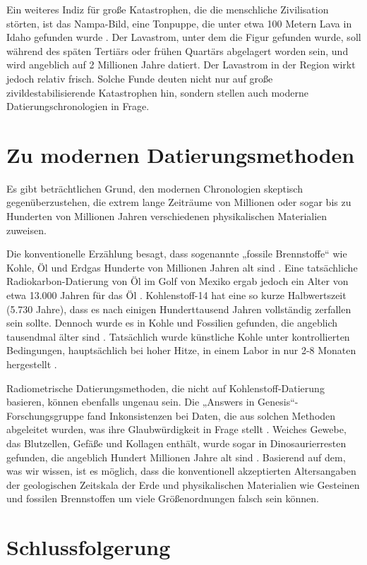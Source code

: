 \documentclass[10pt,twocolumn,letterpaper]{article}
\begin{document}
Ein weiteres Indiz für große Katastrophen, die die menschliche Zivilisation störten, ist das Nampa-Bild, eine Tonpuppe, die unter etwa 100 Metern Lava in Idaho gefunden wurde \cite{102,103}. Der Lavastrom, unter dem die Figur gefunden wurde, soll während des späten Tertiärs oder frühen Quartärs abgelagert worden sein, und wird angeblich auf 2 Millionen Jahre datiert. Der Lavastrom in der Region wirkt jedoch relativ frisch. Solche Funde deuten nicht nur auf große zivildestabilisierende Katastrophen hin, sondern stellen auch moderne Datierungschronologien in Frage.

\section{Zu modernen Datierungsmethoden}
Es gibt beträchtlichen Grund, den modernen Chronologien skeptisch gegenüberzustehen, die extrem lange Zeiträume von Millionen oder sogar bis zu Hunderten von Millionen Jahren verschiedenen physikalischen Materialien zuweisen.

Die konventionelle Erzählung besagt, dass sogenannte „fossile Brennstoffe“ wie Kohle, Öl und Erdgas Hunderte von Millionen Jahren alt sind \cite{104}. Eine tatsächliche Radiokarbon-Datierung von Öl im Golf von Mexiko ergab jedoch ein Alter von etwa 13.000 Jahren für das Öl \cite{105}. Kohlenstoff-14 hat eine so kurze Halbwertszeit (5.730 Jahre), dass es nach einigen Hunderttausend Jahren vollständig zerfallen sein sollte. Dennoch wurde es in Kohle und Fossilien gefunden, die angeblich tausendmal älter sind \cite{106}. Tatsächlich wurde künstliche Kohle unter kontrollierten Bedingungen, hauptsächlich bei hoher Hitze, in einem Labor in nur 2-8 Monaten hergestellt \cite{107}.

Radiometrische Datierungsmethoden, die nicht auf Kohlenstoff-Datierung basieren, können ebenfalls ungenau sein. Die „Answers in Genesis“-Forschungsgruppe fand Inkonsistenzen bei Daten, die aus solchen Methoden abgeleitet wurden, was ihre Glaubwürdigkeit in Frage stellt \cite{108}. Weiches Gewebe, das Blutzellen, Gefäße und Kollagen enthält, wurde sogar in Dinosaurierresten gefunden, die angeblich Hundert Millionen Jahre alt sind \cite{109,110}. Basierend auf dem, was wir wissen, ist es möglich, dass die konventionell akzeptierten Altersangaben der geologischen Zeitskala der Erde und physikalischen Materialien wie Gesteinen und fossilen Brennstoffen um viele Größenordnungen falsch sein können.

\section{Schlussfolgerung}
\end{document}
